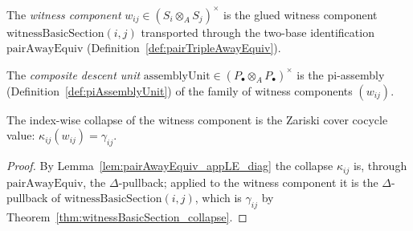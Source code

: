 \begin{definition}
  \label{def:witnessComponent}
  \leanok
  The \emph{witness component} \(w_{ij} \in (S_i \otimes_A S_j)^{\times}\) is the glued witness
  component \(\mathrm{witnessBasicSection}(i, j)\) transported through the two-base
  identification \(\mathrm{pairAwayEquiv}\) (Definition~\ref{def:pairTripleAwayEquiv}).
\end{definition}

\begin{definition}
  \label{def:assemblyUnit}
  \leanok
  The \emph{composite descent unit} \(\mathrm{assemblyUnit} \in (P_{\!\bullet} \otimes_A
  P_{\!\bullet})^{\times}\) is the pi-assembly (Definition~\ref{def:piAssemblyUnit}) of the
  family of witness components \((w_{ij})\).
\end{definition}

\begin{theorem}
  \label{thm:componentCollapse_witnessComponent}
  \leanok
  The index-wise collapse of the witness component is the Zariski cover cocycle value:
  \(\kappa_{ij}(w_{ij}) = \gamma_{ij}\).
\end{theorem}
\begin{proof}
  \leanok
  By Lemma~\ref{lem:pairAwayEquiv_appLE_diag} the collapse \(\kappa_{ij}\) is, through
  \(\mathrm{pairAwayEquiv}\), the \(\Delta\)-pullback; applied to the witness component it is the
  \(\Delta\)-pullback of \(\mathrm{witnessBasicSection}(i, j)\), which is \(\gamma_{ij}\) by
  Theorem~\ref{thm:witnessBasicSection_collapse}.
\end{proof}

